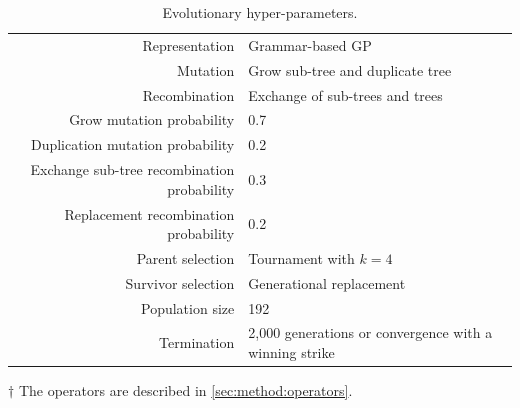 \documentclass[dvipsnames, format=sigconf]{acmart}
\begin{document}
\begin{table}
\caption{Evolutionary hyper-parameters.}
\label{tab:hyperparameters}
\centering
\begin{threeparttable}
\renewcommand{\arraystretch}{1.3}
\begin{tabular}[t]{R{95px}|p{125px}}
Representation & Grammar-based GP \\
Mutation & Grow sub-tree and duplicate tree \tnote{$\dagger$} \\
Recombination & Exchange of sub-trees and trees \tnote{$\dagger$} \\
Grow mutation probability & 0.7\\
Duplication mutation probability & 0.2\\
Exchange sub-tree recombination probability & 0.3\\
Replacement recombination probability & 0.2\\
Parent selection & Tournament with $k=4$\\
Survivor selection & Generational replacement\\
Population size & 192\\
Termination & 2,000 generations or convergence with a winning strike
\end{tabular}
\renewcommand{\arraystretch}{1}
\begin{tablenotes}
\item[$\dagger$] The operators are described in \autoref{sec:method:operators}.
\end{tablenotes}
\end{threeparttable}
\end{table}
\end{document}
